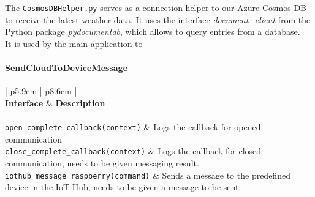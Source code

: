 \documentclass[a4paper]{article}
\begin{document}
				The \texttt{CosmosDBHelper.py} serves as a connection helper to our Azure Cosmos DB to receive the latest weather data. 
				It uses the interface \textit{document\_client} from the Python package \textit{pydocumentdb}, which allows to query entries from a database. \\
				It is used by the main application to 
			
				\newpage
				
				\paragraph{SendCloudToDeviceMessage}
			
				\def\arraystretch{1.3}
				\begin{table} [h!]
					\centering
					\begin{tabular} [h!] { | p{5.9cm} | p{8.6cm} | }
						\hline
						 \\
						\hline\hline
						\textbf{Interface} & \textbf{Description} \\
						\hline
						 \\
						\hline
						\texttt{open\_complete\_callback(context)} & Logs the callback for opened communication \\
						\texttt{close\_complete\_callback(context)} & Logs the callback for closed communication, needs to be given messaging result. \\
						\texttt{iothub\_message\_raspberry(command)} & Sends a message to the predefined device in the IoT Hub, needs to be given a message to be sent. \\
						

\end{tabular}
\end{table}
\end{document}
